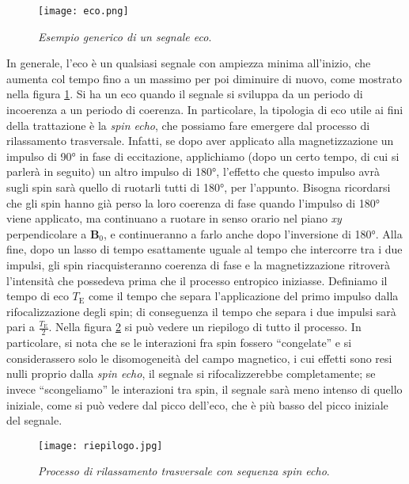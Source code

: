 \documentclass{report}
\newcommand{\virgolette}[1]{``#1''}
\newcommand{\figref}[1]{figura \ref{#1}}
\numberwithin{equation}{section}
\numberwithin{figure}{section}
\renewcommand{\Vec}{\bm}
\begin{document}
\begin{figure}[htp]
    \centering
    \texttt{[image: eco.png]}
    \caption{\textit{Esempio generico di un segnale eco}.}
    \label{fig:eco}
\end{figure}

\noindent In generale, l'eco è un qualsiasi segnale con ampiezza minima all'inizio, che aumenta col tempo fino a un massimo per poi diminuire di nuovo, come mostrato nella \figref{fig:eco}. Si ha un eco quando il segnale si sviluppa da un periodo di incoerenza a un periodo di coerenza. In particolare, la tipologia di eco utile ai fini della trattazione è la \textit{spin echo}, che possiamo fare emergere dal processo di rilassamento trasversale. Infatti, se dopo aver applicato alla magnetizzazione un impulso di 90° in fase di eccitazione, applichiamo (dopo un certo tempo, di cui si parlerà in seguito) un altro impulso di 180°, l'effetto che questo impulso avrà sugli spin sarà quello di ruotarli tutti di 180°, per l'appunto. Bisogna ricordarsi che gli spin hanno già perso la loro coerenza di fase quando l'impulso di 180° viene applicato, ma continuano a ruotare in senso orario nel piano \textit{xy} perpendicolare a $\Vec{B}_0$, e continueranno a farlo anche dopo l'inversione di 180°. Alla fine, dopo un lasso di tempo esattamente uguale al tempo che intercorre tra i due impulsi, gli spin riacquisteranno coerenza di fase e la magnetizzazione ritroverà l'intensità che possedeva prima che il processo entropico iniziasse. Definiamo il tempo di eco $T_\mathrm{E}$ come il tempo che separa l'applicazione del primo impulso dalla rifocalizzazione degli spin; di conseguenza il tempo che separa i due impulsi sarà pari a $\frac{T_\mathrm{E}}{2}$. Nella \figref{fig:riepilogo} si può vedere un riepilogo di tutto il processo. In particolare, si nota che se le interazioni fra spin fossero \virgolette{congelate} e si considerassero solo le disomogeneità del campo magnetico, i cui effetti sono resi nulli proprio dalla \textit{spin echo}, il segnale si rifocalizzerebbe completamente; se invece \virgolette{scongeliamo} le interazioni tra spin, il segnale sarà meno intenso di quello iniziale, come si può vedere dal picco dell'eco, che è più basso del picco iniziale del segnale.

\begin{figure}[htp]
    \centering
    \texttt{[image: riepilogo.jpg]}
    \caption{\textit{Processo di rilassamento trasversale con sequenza spin echo}.}
    \label{fig:riepilogo}
\end{figure}
\end{document}
